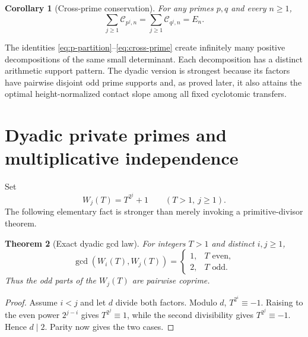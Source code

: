 \documentclass[11pt]{article}
\newtheorem{theorem}{Theorem}[section]
\newtheorem{corollary}[theorem]{Corollary}
\theoremstyle{definition}
\begin{document}
\begin{corollary}[Cross-prime conservation]\label{cor:cross-prime}
For any primes $p,q$ and every $n\ge1$,
\begin{equation}\label{eq:cross-prime}
 \sum_{j\ge1}\mathcal C_{p^j,n}
 =\sum_{j\ge1}\mathcal C_{q^j,n}=E_n.
\end{equation}
\end{corollary}

\begin{aenovelbox}
The identities \eqref{eq:p-partition}--\eqref{eq:cross-prime} create infinitely many
positive decompositions of the same small determinant.  Each decomposition has a distinct
arithmetic support pattern.  The dyadic version is strongest because its factors have
pairwise disjoint odd prime supports and, as proved later, it also attains the optimal
height-normalized contact slope among all fixed cyclotomic transfers.
\end{aenovelbox}

\section{Dyadic private primes and multiplicative independence}
\label{sec:private-primes}

Set
\begin{equation}\label{eq:Wj}
 W_j(T)=T^{2^j}+1\qquad(T>1,\ j\ge1).
\end{equation}
The following elementary fact is stronger than merely invoking a primitive-divisor
theorem.

\begin{theorem}[Exact dyadic gcd law]\label{thm:dyadic-gcd}
For integers $T>1$ and distinct $i,j\ge1$,
\begin{equation}\label{eq:dyadic-gcd}
 \gcd(W_i(T),W_j(T))=
 \begin{cases}
  1,&T\text{ even},\\
  2,&T\text{ odd}.
 \end{cases}
\end{equation}
Thus the odd parts of the $W_j(T)$ are pairwise coprime.
\end{theorem}

\begin{proof}
Assume $i<j$ and let $d$ divide both factors.  Modulo $d$,
$T^{2^i}\equiv-1$.  Raising to the even power $2^{j-i}$ gives
$T^{2^j}\equiv1$, while the second divisibility gives
$T^{2^j}\equiv-1$.  Hence $d\mid2$.  Parity now gives the two cases.
\end{proof}
\end{document}
